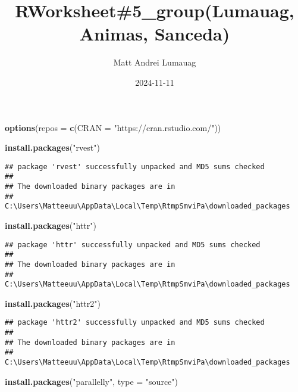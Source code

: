 \documentclass[
]{article}
\title{RWorksheet\#5\_group(Lumauag, Animas, Sanceda)}
\author{Matt Andrei Lumauag}
\date{2024-11-11}
\newenvironment{Shaded}{\begin{snugshade}}{\end{snugshade}}
\newcommand{\AttributeTok}[1]{\textcolor[rgb]{0.13,0.29,0.53}{#1}}
\newcommand{\FunctionTok}[1]{\textcolor[rgb]{0.13,0.29,0.53}{\textbf{#1}}}
\newcommand{\NormalTok}[1]{#1}
\newcommand{\StringTok}[1]{\textcolor[rgb]{0.31,0.60,0.02}{#1}}
\begin{document}
\maketitle

\begin{Shaded}
\begin{Highlighting}[]
\FunctionTok{options}\NormalTok{(}\AttributeTok{repos =} \FunctionTok{c}\NormalTok{(}\AttributeTok{CRAN =} \StringTok{"https://cran.rstudio.com/"}\NormalTok{))}

\FunctionTok{install.packages}\NormalTok{(}\StringTok{"rvest"}\NormalTok{)}
\end{Highlighting}
\end{Shaded}

\begin{verbatim}
## package 'rvest' successfully unpacked and MD5 sums checked
## 
## The downloaded binary packages are in
##  C:\Users\Matteeuu\AppData\Local\Temp\RtmpSmviPa\downloaded_packages
\end{verbatim}

\begin{Shaded}
\begin{Highlighting}[]
\FunctionTok{install.packages}\NormalTok{(}\StringTok{"httr"}\NormalTok{)}
\end{Highlighting}
\end{Shaded}

\begin{verbatim}
## package 'httr' successfully unpacked and MD5 sums checked
## 
## The downloaded binary packages are in
##  C:\Users\Matteeuu\AppData\Local\Temp\RtmpSmviPa\downloaded_packages
\end{verbatim}

\begin{Shaded}
\begin{Highlighting}[]
\FunctionTok{install.packages}\NormalTok{(}\StringTok{"httr2"}\NormalTok{) }
\end{Highlighting}
\end{Shaded}

\begin{verbatim}
## package 'httr2' successfully unpacked and MD5 sums checked
## 
## The downloaded binary packages are in
##  C:\Users\Matteeuu\AppData\Local\Temp\RtmpSmviPa\downloaded_packages
\end{verbatim}

\begin{Shaded}
\begin{Highlighting}[]
\FunctionTok{install.packages}\NormalTok{(}\StringTok{"parallelly"}\NormalTok{, }\AttributeTok{type =} \StringTok{"source"}\NormalTok{)}
\end{Highlighting}
\end{Shaded}
\end{document}
